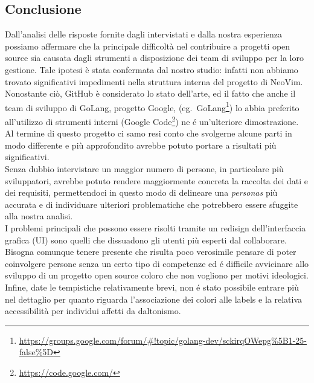 \documentclass[12pt]{article} %
\begin{document}
\subsection{Conclusione}
Dall'analisi delle risposte fornite dagli intervistati e dalla nostra esperienza possiamo affermare che la principale difficolt\`a nel contribuire a progetti open source sia causata dagli strumenti a disposizione dei team di sviluppo per la loro gestione. Tale ipotesi \`e stata confermata dal nostro studio: infatti non abbiamo trovato significativi impedimenti nella struttura interna del progetto di NeoVim.\\
Nonostante ci\`o, GitHub \`e considerato lo stato dell'arte, ed il fatto che anche il team di sviluppo di GoLang, progetto Google, (eg.\ GoLang\footnote{\url{https://groups.google.com/forum/#!topic/golang-dev/sckirqOWepg\%5B1-25-false\%5D}}) lo abbia preferito all'utilizzo di strumenti interni (Google Code\footnote{\url{https://code.google.com/}}) ne \'e un'ulteriore dimostrazione.\\
Al termine di questo progetto ci samo resi conto che svolgerne alcune parti in modo differente e pi\`u approfondito avrebbe potuto portare a risultati pi\`u significativi.\\
Senza dubbio intervistare un maggior numero di persone, in particolare pi\`u sviluppatori, avrebbe potuto rendere maggiormente concreta la raccolta dei dati e dei requisiti, permettendoci in questo modo di delineare una \emph{personas} pi\`u accurata e di individuare ulteriori problematiche che potrebbero essere sfuggite alla nostra analisi.\\
I problemi principali che possono essere risolti tramite un redisign dell'interfaccia grafica (UI) sono quelli che dissuadono gli utenti pi\`u esperti dal collaborare. Bisogna comunque tenere presente che risulta poco verosimile pensare di poter coinvolgere persone senza un certo tipo di competenze ed \'e difficile avvicinare allo sviluppo di un progetto open source coloro che non vogliono per motivi ideologici.\\
Infine, date le tempistiche relativamente brevi, non \'e stato possibile entrare pi\`u nel dettaglio per quanto riguarda l'associazione dei colori alle labels e la relativa accessibilit\`a per individui affetti da daltonismo.


\newpage


\end{document}

